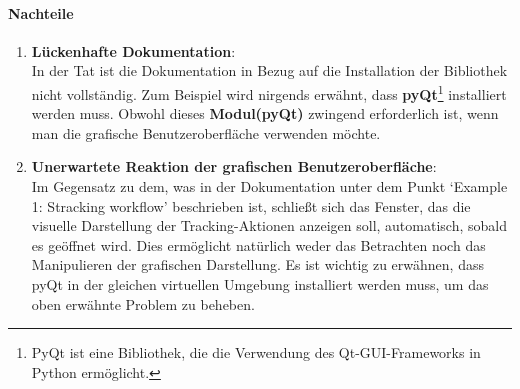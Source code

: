 	\paragraph{Nachteile}
		\begin{enumerate}
    			\item \textbf{Lückenhafte Dokumentation}:\\
				In der Tat ist die Dokumentation in Bezug auf die Installation der Bibliothek nicht vollständig. Zum Beispiel wird nirgends erwähnt, dass \textbf{pyQt}\footnote{PyQt ist eine Bibliothek, die die Verwendung des Qt-GUI-Frameworks in Python ermöglicht.} installiert werden muss. Obwohl dieses \textbf{Modul(pyQt)} zwingend erforderlich ist, wenn man die grafische Benutzeroberfläche verwenden möchte.
				
    			\item \textbf{Unerwartete Reaktion der grafischen Benutzeroberfläche}:\\
				Im Gegensatz zu dem, was in der Dokumentation unter dem Punkt `Example 1: Stracking workflow' beschrieben ist, schließt sich das Fenster, das die visuelle Darstellung der Tracking-Aktionen anzeigen soll, automatisch, sobald es geöffnet wird.  Dies ermöglicht natürlich weder das Betrachten noch das Manipulieren der grafischen Darstellung. Es ist wichtig zu erwähnen, dass pyQt in der gleichen virtuellen Umgebung installiert werden muss, um das oben erwähnte Problem zu beheben.
    			
		\end{enumerate}
		

	

